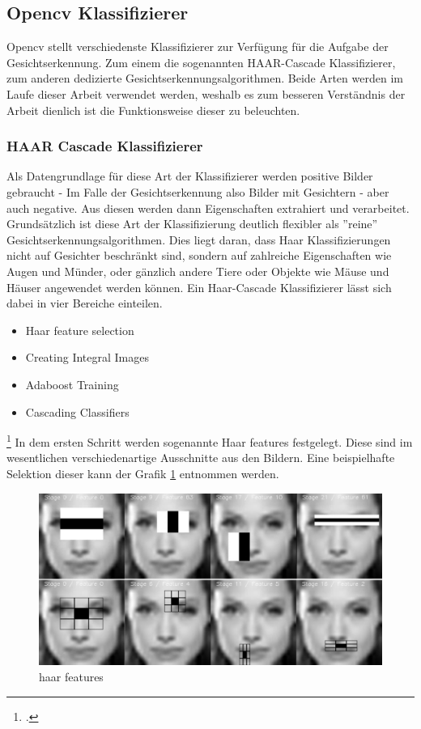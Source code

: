 \documentclass[12pt, a4paper]{report}
\newcommand*\setcaptioncitation[1]{\def\captioncitation{\textit{Quelle:}~#1}}
\let\captioncitation\relax
\begin{document}
\subsection{Opencv Klassifizierer}
Opencv stellt verschiedenste Klassifizierer zur Verfügung für die Aufgabe der Gesichtserkennung. Zum einem die sogenannten HAAR-Cascade Klassifizierer, zum anderen dedizierte Gesichtserkennungsalgorithmen. Beide Arten werden im Laufe dieser Arbeit verwendet werden, weshalb es zum besseren Verständnis der Arbeit dienlich ist die Funktionsweise dieser zu beleuchten.
\subsubsection{HAAR Cascade Klassifizierer}
Als Datengrundlage für diese Art der Klassifizierer werden positive Bilder gebraucht - Im Falle der Gesichtserkennung also Bilder mit Gesichtern - aber auch negative. Aus diesen werden dann Eigenschaften extrahiert und verarbeitet. Grundsätzlich ist diese Art der Klassifizierung deutlich flexibler als ''reine'' Gesichtserkennungsalgorithmen. Dies liegt daran, dass Haar Klassifizierungen nicht auf Gesichter beschränkt sind, sondern auf zahlreiche Eigenschaften wie Augen und Münder, oder gänzlich andere Tiere oder Objekte wie Mäuse und Häuser angewendet werden können.
Ein Haar-Cascade Klassifizierer lässt sich dabei in vier Bereiche einteilen.
\begin{itemize}
\item Haar feature selection
\item Creating  Integral Images
\item Adaboost Training
\item Cascading Classifiers
\end{itemize}
\footcite[Vgl.][]{willberger}
In dem ersten Schritt werden sogenannte Haar features festgelegt. Diese sind im wesentlichen verschiedenartige Ausschnitte aus den Bildern. Eine beispielhafte Selektion dieser kann der   Grafik \ref{fig: haar-features} entnommen werden.
\begin{figure}[h]
\includegraphics[width=\linewidth]{Bilder/haar-cascade.png}
\setcaptioncitation{ https://docs.opencv.org/master/dc/d88/tutorial\_traincascade.html}
\caption{haar features}
\label{fig: haar-features}
\end{figure}
\end{document}
